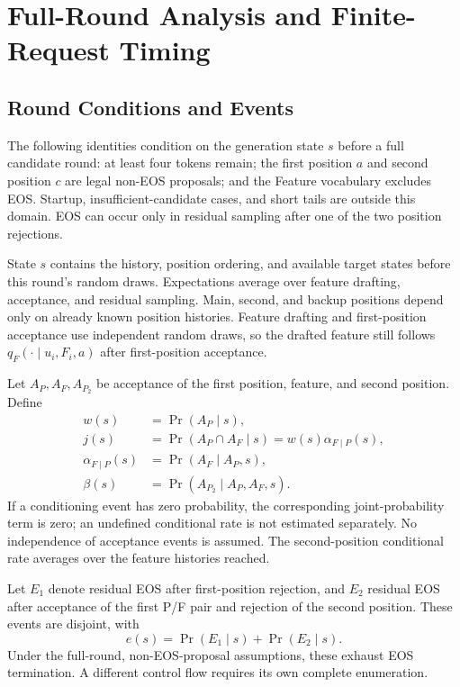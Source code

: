 \section{Full-Round Analysis and Finite-Request Timing}
\label{app:analysis}
\subsection{Round Conditions and Events}
\label{app:events}
The following identities condition on the generation state $s$ before a full candidate round: at least four tokens remain; the first position $a$ and second position $c$ are legal non-EOS proposals; and the Feature vocabulary excludes EOS. Startup, insufficient-candidate cases, and short tails are outside this domain. EOS can occur only in residual sampling after one of the two position rejections.

State $s$ contains the history, position ordering, and available target states before this round's random draws. Expectations average over feature drafting, acceptance, and residual sampling. Main, second, and backup positions depend only on already known position histories. Feature drafting and first-position acceptance use independent random draws, so the drafted feature still follows $q_F(\cdot\mid u_i,F_i,a)$ after first-position acceptance.

Let $A_P,A_F,A_{P_2}$ be acceptance of the first position, feature, and second position. Define
\begin{align}
w(s)&=\Pr(A_P\mid s),\\
j(s)&=\Pr(A_P\cap A_F\mid s)=w(s)\alpha_{F\mid P}(s),\\
\alpha_{F\mid P}(s)&=\Pr(A_F\mid A_P,s),\\
\beta(s)&=\Pr(A_{P_2}\mid A_P,A_F,s).
\end{align}
If a conditioning event has zero probability, the corresponding joint-probability term is zero; an undefined conditional rate is not estimated separately. No independence of acceptance events is assumed. The second-position conditional rate averages over the feature histories reached.

Let $E_1$ denote residual EOS after first-position rejection, and $E_2$ residual EOS after acceptance of the first P/F pair and rejection of the second position. These events are disjoint, with
\begin{equation}
e(s)=\Pr(E_1\mid s)+\Pr(E_2\mid s).
\end{equation}
Under the full-round, non-EOS-proposal assumptions, these exhaust EOS termination. A different control flow requires its own complete enumeration.

